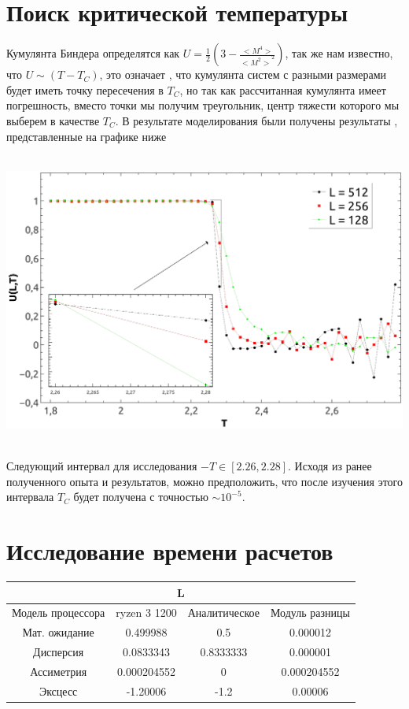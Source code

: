 \documentclass[12pt,a4paper]{article}
\begin{document}
	\section{Поиск критической температуры}
	Кумулянта Биндера определятся как $U = \frac{1}{2}(3 - \frac{<M^4>}{{<M^2>}^2})$, так же нам известно, что $U \sim (T - T_C)$, это означает , что кумулянта систем с разными размерами будет иметь точку пересечения в $T_C$, но так как рассчитанная кумулянта имеет погрешность, вместо точки мы получим треугольник, центр тяжести которого мы выберем в качестве $T_C$. 
	В результате моделирования были получены результаты , представленные на графике ниже
	\begin{center}
		\mbox{
			\includegraphics[scale=0.4]{U(L,T)}
		}
	\end{center} 
	Следующий интервал для исследования $- T \in[2.26, 2.28]$. Исходя из ранее полученного опыта и результатов, можно предположить, что после изучения этого интервала $T_C$ будет получена с точностью $\sim {10}^{-5}$.
	\section{Исследование времени расчетов}
	\begin{center}
		\begin{tabular}{|c|c|c|c|}
			\hline
			\multicolumn{4}{|c|}{L}\\
			\hline
			Модель процессора
			& ryzen 3 1200
			& Аналитическое
			& Модуль разницы \\
			\hline
			Мат. ожидание& 0.499988 & 0.5 & 0.000012 \\
			\hline
			Дисперсия& 0.0833343 & 0.8333333 & 0.000001 \\
			\hline
			Ассиметрия& 0.000204552 & 0 & 0.000204552 \\
			\hline
			Эксцесс& -1.20006 & -1.2 & 0.00006 \\
			\hline
			\hline
		\end{tabular}
	\end{center}
	

\newpage
\end{document}
